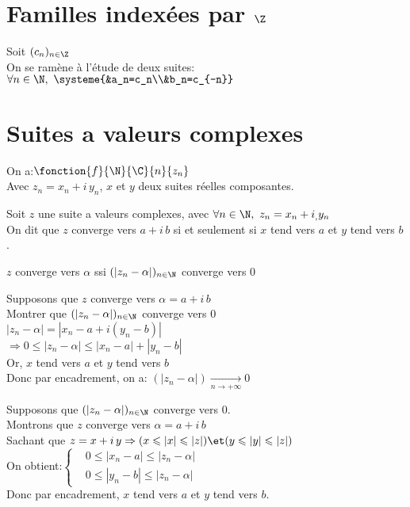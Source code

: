 \documentclass[12pt,twoside,a4paper]{article}
\author{MPSI 2}
\begin{document}
	\maketitle
	\section{Familles index\'ees par $\Z$}
		Soit $(c_n)_{n\in\Z}$\\
		On se ram\`ene \`a l'\'etude de deux suites:\\
		$\forall n\in\N,\ \systeme{&a_n=c_n\\&b_n=c_{-n}}$
	\section{Suites a valeurs complexes}
		On a:$\fonction{f}{\N}{\C}{n}{z_n}$\\
		Avec $z_n=x_n+i\,y_n$, $x$ et $y$ deux suites r\'eelles composantes.
		\begin{defi}
			Soit $z$ une suite a valeurs complexes, avec $\forall n\in\N,\ z_n=x_n+i_,y_n$\\
			On dit que $z$ converge vers $a+i\,b$ si et seulement si $x$ tend vers $a$ et $y$ tend vers $b$.
		\end{defi}
		\begin{prop}
			$z$ converge vers $\alpha$ ssi $(|z_n-\alpha|)_{n\in\N}$ converge vers $0$
		\end{prop}
		\begin{preuve}
			\begin{liste}
				\item[\cercle1]Supposons que $z$ converge vers $\alpha=a+i\,b$\\
					Montrer que $(|z_n-\alpha|)_{n\in\N}$ converge vers $0$\\
					$|z_n-\alpha|=|x_n-a+i(y_n-b)|$\\
					$\Rightarrow0\leqslant|z_n-\alpha|\leqslant|x_n-a|+|y_n-b|$\\
					Or, $x$ tend vers $a$ et $y$ tend vers $b$\\
					Donc par encadrement, on a: $(|z_n-\alpha|)\mathop{\longrightarrow}\limits_{n\rightarrow+\infty}0$
				\item[\cercle2]Supposons que $(|z_n-\alpha|)_{n\in\N}$ converge vers $0$.\\
					Montrons que $z$ converge vers $\alpha=a+i\,b$\\
					Sachant que $z=x+i\,y\Rightarrow(x\leqslant|x|\leqslant|z|)\et(y\leqslant|y|\leqslant|z|)$\\
					On obtient:$\left\{\begin{aligned}
						& 0\leqslant|x_n-a|\leqslant|z_n-\alpha|\\
						& 0\leqslant|y_n-b|\leqslant|z_n-\alpha|
					\end{aligned}\right.$\\
					Donc par encadrement, $x$ tend vers $a$ et $y$ tend vers $b$.
			\end{liste}
		\end{preuve}
\end{document}
